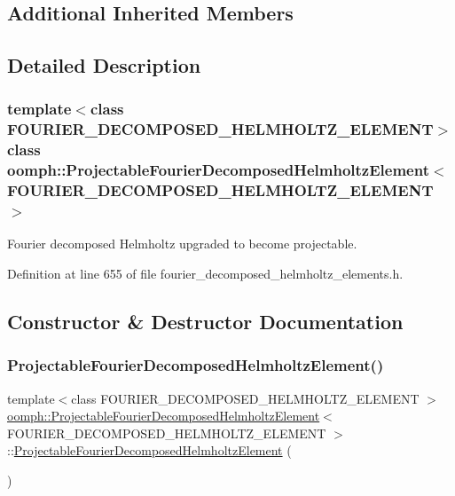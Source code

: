 \subsection*{Additional Inherited Members}


\subsection{Detailed Description}
\subsubsection*{template$<$class F\+O\+U\+R\+I\+E\+R\+\_\+\+D\+E\+C\+O\+M\+P\+O\+S\+E\+D\+\_\+\+H\+E\+L\+M\+H\+O\+L\+T\+Z\+\_\+\+E\+L\+E\+M\+E\+NT$>$\newline
class oomph\+::\+Projectable\+Fourier\+Decomposed\+Helmholtz\+Element$<$ F\+O\+U\+R\+I\+E\+R\+\_\+\+D\+E\+C\+O\+M\+P\+O\+S\+E\+D\+\_\+\+H\+E\+L\+M\+H\+O\+L\+T\+Z\+\_\+\+E\+L\+E\+M\+E\+N\+T $>$}

Fourier decomposed Helmholtz upgraded to become projectable. 

Definition at line 655 of file fourier\+\_\+decomposed\+\_\+helmholtz\+\_\+elements.\+h.



\subsection{Constructor \& Destructor Documentation}
\mbox{\label{classoomph_1_1ProjectableFourierDecomposedHelmholtzElement_a2cd1deafcbc0f63b017a98cf8d067110}} 
\subsubsection{\texorpdfstring{Projectable\+Fourier\+Decomposed\+Helmholtz\+Element()}{ProjectableFourierDecomposedHelmholtzElement()}}
{\footnotesize\ttfamily template$<$class F\+O\+U\+R\+I\+E\+R\+\_\+\+D\+E\+C\+O\+M\+P\+O\+S\+E\+D\+\_\+\+H\+E\+L\+M\+H\+O\+L\+T\+Z\+\_\+\+E\+L\+E\+M\+E\+NT $>$ \\
\hyperlink{classoomph_1_1ProjectableFourierDecomposedHelmholtzElement}{oomph\+::\+Projectable\+Fourier\+Decomposed\+Helmholtz\+Element}$<$ F\+O\+U\+R\+I\+E\+R\+\_\+\+D\+E\+C\+O\+M\+P\+O\+S\+E\+D\+\_\+\+H\+E\+L\+M\+H\+O\+L\+T\+Z\+\_\+\+E\+L\+E\+M\+E\+NT $>$\+::\hyperlink{classoomph_1_1ProjectableFourierDecomposedHelmholtzElement}{Projectable\+Fourier\+Decomposed\+Helmholtz\+Element} (\begin{DoxyParamCaption}{ }\end{DoxyParamCaption})\hspace{0.3cm}{\ttfamily [inline]}}



